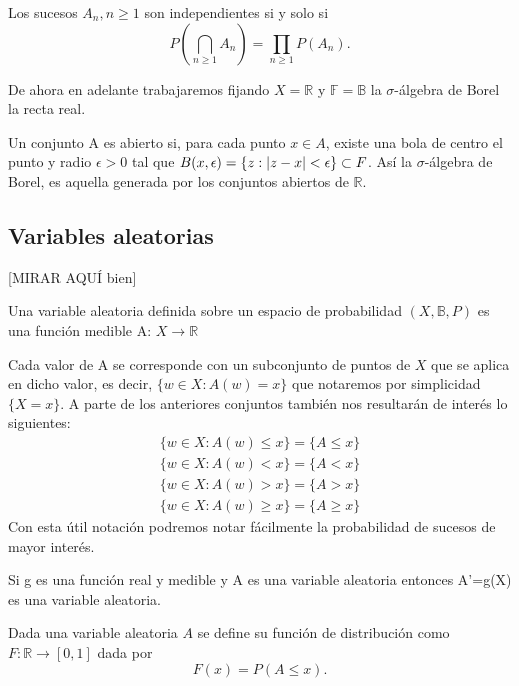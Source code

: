 \documentclass[../proyecto.tex]{memoir}
\begin{document}
\begin{defi}
Los sucesos ${A_n, n \geq 1}$ son independientes si y solo si $$
P \left( \bigcap_{n \geq 1} A_{n} \right) = \prod_{n \geq 1} P(A_n).
$$
\end{defi}

De ahora en adelante trabajaremos fijando $X=\mathds{R}$ y $\mathds{F}=\mathds{B}$ la $\sigma$-álgebra de Borel la recta real.
\begin{defi}
Un conjunto A es abierto si, para cada punto $x\in A$, existe una bola de centro el punto y radio $\epsilon > 0$ tal que $B(x,\epsilon)=\{ z : \abs{z-x} < \epsilon\} \subset F$. Así la $\sigma$-álgebra de Borel, es aquella generada por los conjuntos abiertos de $\mathds{R}$.
\end{defi}

\subsection{Variables aleatorias}

[MIRAR AQUÍ bien]
\begin{defi}
Una variable aleatoria definida sobre un espacio de probabilidad $(X, \mathds{B}, P)$ es una función medible A: $X \rightarrow \mathds{R}$
\end{defi}

Cada valor de A se corresponde con un subconjunto de puntos de $X$ que se aplica en dicho valor, es decir, $ \{ w\in X : A(w)=x\}$ que notaremos por simplicidad $\{X = x\}$. A parte de los anteriores conjuntos también nos resultarán de interés lo siguientes:
\begin{align*}
\{ w\in X : A(w) \leq x\} = \{ A \leq x \} \\
\{ w\in X : A(w) < x\} = \{ A < x \} \\
\{ w\in X : A(w) > x\} = \{ A > x \} \\
\{ w\in X : A(w) \geq x\} = \{ A \geq x \}
\end{align*}
Con esta útil notación podremos notar fácilmente la probabilidad de sucesos de mayor interés.

\begin{prop} \label{funcion_de_va}
Si g es una función real y medible y A es una variable aleatoria entonces A'=g(X) es una variable aleatoria.
\end{prop}

\begin{defi}
Dada una variable aleatoria $A$ se define su función de distribución como $ F : \mathds{R} \rightarrow [0,1] $ dada por 
$$
F(x)=P(A \leq x).
$$
\end{defi}
\end{document}
